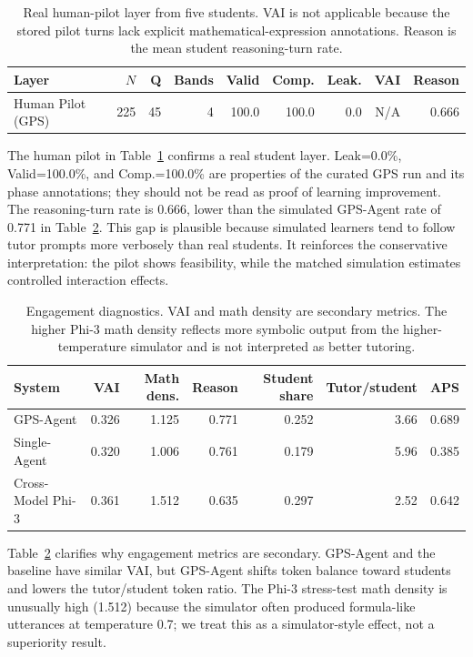 \documentclass[11pt]{article}
\begin{document}
\begin{table}[t]
\centering
\small
\begin{tabular}{lrrrrrrrr}
\toprule
Layer & $N$ & Q & Bands & Valid & Comp. & Leak. & VAI & Reason \\
\midrule
Human Pilot (GPS) & 225 & 45 & 4 & 100.0 & 100.0 & 0.0 & N/A & 0.666 \\
\bottomrule
\end{tabular}
\caption{Real human-pilot layer from five students. VAI is not applicable because the stored pilot turns lack explicit mathematical-expression annotations. Reason is the mean student reasoning-turn rate.}
\label{tab:human}
\end{table}

The human pilot in Table~\ref{tab:human} confirms a real student layer. Leak=0.0\%, Valid=100.0\%, and Comp.=100.0\% are properties of the curated GPS run and its phase annotations; they should not be read as proof of learning improvement. The reasoning-turn rate is 0.666, lower than the simulated GPS-Agent rate of 0.771 in Table~\ref{tab:engagement}. This gap is plausible because simulated learners tend to follow tutor prompts more verbosely than real students. It reinforces the conservative interpretation: the pilot shows feasibility, while the matched simulation estimates controlled interaction effects.

\begin{table}[t]
\centering
\small
\begin{tabular}{lrrrrrr}
\toprule
System & VAI & Math dens. & Reason & Student share & Tutor/student & APS \\
\midrule
GPS-Agent & 0.326 & 1.125 & 0.771 & 0.252 & 3.66 & 0.689 \\
Single-Agent & 0.320 & 1.006 & 0.761 & 0.179 & 5.96 & 0.385 \\
Cross-Model Phi-3 & 0.361 & 1.512 & 0.635 & 0.297 & 2.52 & 0.642 \\
\bottomrule
\end{tabular}
\caption{Engagement diagnostics. VAI and math density are secondary metrics. The higher Phi-3 math density reflects more symbolic output from the higher-temperature simulator and is not interpreted as better tutoring.}
\label{tab:engagement}
\end{table}

Table~\ref{tab:engagement} clarifies why engagement metrics are secondary. GPS-Agent and the baseline have similar VAI, but GPS-Agent shifts token balance toward students and lowers the tutor/student token ratio. The Phi-3 stress-test math density is unusually high (1.512) because the simulator often produced formula-like utterances at temperature 0.7; we treat this as a simulator-style effect, not a superiority result.
\end{document}
